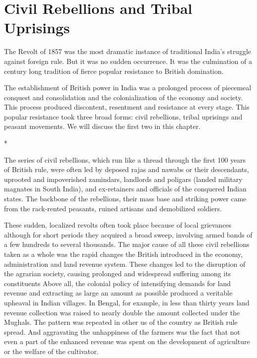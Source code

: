 \chapter{Civil Rebellions and Tribal Uprisings}

The Revolt of 1857 was the most dramatic instance of traditional India’s struggle against foreign rule. But it was no sudden occurrence. It was the culmination of a century long tradition of fierce popular resistance to British domination.

The establishment of British power in India was a prolonged process of piecemeal conquest and consolidation and the colonialization of the economy and society. This process produced discontent, resentment and resistance at every stage. This popular resistance took three broad forms: civil rebellions, tribal uprisings and peasant movements. We will discuss the first two in this chapter.

\begin{center}*\end{center}

The series of civil rebellions, which run like a thread through the first 100 years of British rule, were often led by deposed rajas and nawabs or their descendants, uprooted and impoverished zamindars, landlords and poligars (landed military magnates in South India), and ex-retainers and officials of the conquered Indian states. The backbone of the rebellions, their mass base and striking power came from the rack-rented peasants, ruined artisans and demobilized soldiers.

These sudden, localized revolts often took place because of local grievances although for short periods they acquired a broad sweep, involving armed bands of a few hundreds to several thousands. The major cause of all these civil rebellions taken as a whole was the rapid changes the British introduced in the economy, administration and land revenue system. These changes led to the disruption of the agrarian society, causing prolonged and widespread suffering among its constituents Above all, the colonial policy of intensifying demands for land revenue and extracting as large an amount as possible produced a veritable upheaval in Indian villages. In Bengal, for example, in less than thirty years land revenue collection was raised to nearly double the amount collected under the Mughals. The pattern was repeated in other us of the country as British rule spread. And aggravating the unhappiness of the farmers was the fact that not even a part of the enhanced revenue was spent on the development of agriculture or the welfare of the cultivator.

